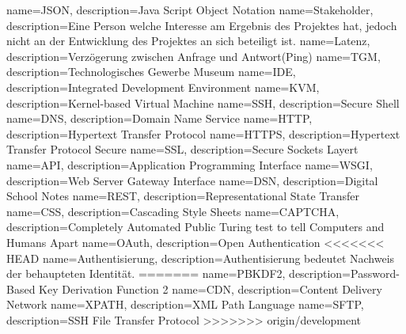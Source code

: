 \makeglossaries
{} {name=JSON, description={Java Script Object Notation}}
 {name=Stakeholder, description={Eine Person welche Interesse am Ergebnis des Projektes hat, jedoch nicht an der Entwicklung des Projektes an sich beteiligt ist.}}
 {name=Latenz, description={Verzögerung zwischen Anfrage und Antwort(Ping)}}
 {name=TGM, description={Technologisches Gewerbe Museum}}
 {name=IDE, description={Integrated Development Environment}}
 {name=KVM, description={Kernel-based Virtual Machine}}
 {name=SSH, description={Secure Shell}}
 {name=DNS, description={Domain Name Service}}
 {name=HTTP, description={Hypertext Transfer Protocol}}
 {name=HTTPS, description={Hypertext Transfer Protocol Secure}}
 {name=SSL, description={Secure Sockets Layert}}
 {name=API, description={Application Programming Interface}}
 {name=WSGI, description={Web Server Gateway Interface}}
 {name=DSN, description={Digital School Notes}}
 {name=REST, description={Representational State Transfer}}
 {name=CSS, description={Cascading Style Sheets}}
 {name=CAPTCHA, description={Completely Automated Public Turing test to tell Computers and Humans Apart}}
 {name=OAuth, description={Open Authentication}}
<<<<<<< HEAD
 {name=Authentisierung, description={Authentisierung bedeutet Nachweis der behaupteten Identität.}}
=======
 {name=PBKDF2, description={Password-Based Key Derivation Function 2}}
 {name=CDN, description={Content Delivery Network}}
 {name=XPATH, description={XML Path Language}}
 {name=SFTP, description={SSH File Transfer Protocol}}
>>>>>>> origin/development

\renewcommand*\glspostdescription{\dotfill}

